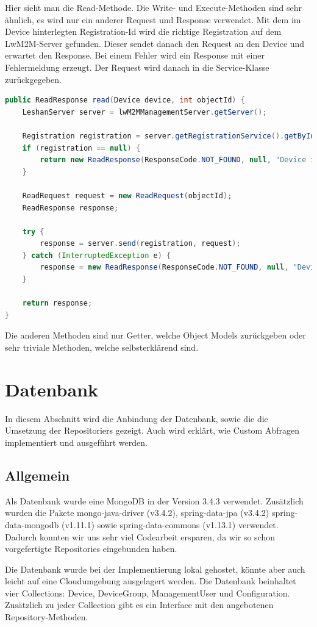 Hier sieht man die Read-Methode. Die Write- und Execute-Methoden sind sehr ähnlich, es wird nur ein anderer Request und Response verwendet. Mit dem im Device hinterlegten Registration-Id wird die richtige Registration auf dem LwM2M-Server gefunden. Dieser sendet danach den Request an den Device und erwartet den Response. Bei einem Fehler wird ein Response mit einer Fehlermeldung erzeugt. Der Request wird danach in die Service-Klasse zurückgegeben.
\begin{lstlisting}[language=java]
public ReadResponse read(Device device, int objectId) {
	LeshanServer server = lwM2MManagementServer.getServer();

	Registration registration = server.getRegistrationService().getById(device.getRegId());
	if (registration == null) {
		return new ReadResponse(ResponseCode.NOT_FOUND, null, "Device is not reachable");
	}

	ReadRequest request = new ReadRequest(objectId);
	ReadResponse response;

	try {
		response = server.send(registration, request);
	} catch (InterruptedException e) {
		response = new ReadResponse(ResponseCode.NOT_FOUND, null, "Device is not reachable");
	}

	return response;
}
\end{lstlisting}

Die anderen Methoden sind nur Getter, welche Object Models zurückgeben oder sehr triviale Methoden, welche selbsterklärend sind.

\newpage

\section{Datenbank}
In diesem Abschnitt wird die Anbindung der Datenbank, sowie die die Umsetzung der Repositoriers gezeigt. Auch wird erklärt, wie Custom Abfragen implementiert und ausgeführt werden. 
\subsection{Allgemein}
Als Datenbank wurde eine MongoDB in der Version 3.4.3 verwendet. Zusätzlich wurden die Pakete mongo-java-driver (v3.4.2), spring-data-jpa (v3.4.2) spring-data-mongodb (v1.11.1) sowie spring-data-commons (v1.13.1) verwendet. Dadurch konnten wir uns sehr viel Codearbeit ersparen, da wir so schon vorgefertigte Repositories eingebunden haben.

Die Datenbank wurde bei der Implementierung lokal gehostet, könnte aber auch leicht auf eine Cloudumgebung ausgelagert werden. Die Datenbank beinhaltet vier Collections: Device, DeviceGroup, ManagementUser und Configuration. Zusätzlich zu jeder Collection gibt es ein Interface mit den angebotenen Repository-Methoden.

